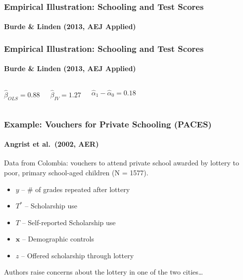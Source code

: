 \documentclass{beamer}
\begin{document}
\begin{frame}
  \frametitle{Empirical Illustration: Schooling and Test Scores}
\framesubtitle{Burde \& Linden (2013, AEJ Applied)}
\begin{figure}[h]
  \scriptsize
  \begingroup
  \centering
  
  \endgroup
\end{figure}
\end{frame}
\begin{frame}
  \frametitle{Empirical Illustration: Schooling and Test Scores}
\framesubtitle{Burde \& Linden (2013, AEJ Applied)}
    \begin{columns}[c]
    $\widehat{\beta}_{OLS} = 0.88$

    $\widehat{\beta}_{IV} = 1.27$

    $\widehat{\alpha}_1 - \widehat{\alpha}_0 = 0.18$
        \begin{figure}[h]
          \scriptsize
          \begingroup
          \centering
          
          \endgroup
        \end{figure}
    \end{columns}
\end{frame}

\begin{frame}
  \frametitle{Example: Vouchers for Private Schooling (PACES)}
  \framesubtitle{Angrist et al.\ (2002, AER)}

  Data from Colombia: vouchers to attend private school awarded by lottery to poor, primary school-aged children (N = 1577). 
  

\begin{itemize}
  \item $y$ -- \# of grades repeated after lottery
  \item $T^*$ -- Scholarship use 
  \item $T$ -- Self-reported Scholarship use
  \item $\mathbf{x}$ -- Demographic controls
  \item $z$ -- Offered scholarship through lottery 
\end{itemize}

\alert{Authors raise concerns about the lottery in one of the two cities\ldots}
\end{frame}
\end{document}
